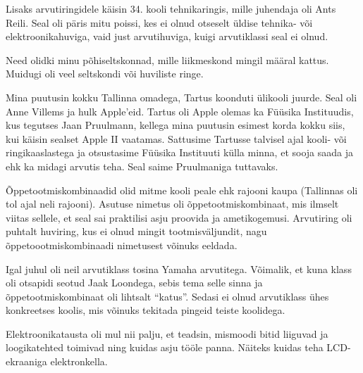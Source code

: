 Lisaks arvutiringidele käisin 34. kooli 
tehnikaringis, mille juhendaja oli Ants Reili. Seal oli 
päris mitu poissi, kes ei olnud otseselt üldise tehnika- 
või elektroonikahuviga, vaid just arvutihuviga, kuigi arvutiklassi
seal ei olnud.

Need olidki minu põhiseltskonnad, mille liikmeskond mingil määral kattus. Muidugi oli 
veel seltskondi või huviliste ringe.


Mina puutusin kokku Tallinna omadega, Tartus koonduti ülikooli 
juurde. Seal oli Anne Villems ja hulk
Apple'eid. Tartus oli Apple olemas ka Füüsika 
Instituudis, kus tegutses Jaan 
Pruulmann, kellega mina puutusin esimest korda kokku siis, 
kui käisin sealset Apple II vaatamas. Sattusime Tartusse talvisel ajal kooli- või 
ringikaaslastega ja otsustasime Füüsika Instituuti külla minna, 
et sooja saada ja ehk ka midagi
arvutis teha. Seal saime Pruulmaniga tuttavaks.

\label{content!OTK}

Õppetootmiskombinaadid olid mitme kooli peale ehk rajooni 
kaupa (Tallinnas oli tol ajal neli rajooni). 
Asutuse nimetus oli õppetootmiskombinaat, mis ilmselt viitas 
sellele, et seal sai praktilisi asju proovida ja 
ametikogemusi. Arvutiring oli puhtalt huviring, kus ei 
olnud mingit tootmisväljundit, nagu õppetoootmiskombinaadi nimetusest võinuks 
eeldada.


Igal juhul oli neil arvutiklass tosina Yamaha arvutitega. Võimalik, et 
kuna klass oli otsapidi seotud Jaak Loondega, sebis tema selle sinna ja õppetootmiskombinaat oli lihtsalt \enquote{katus}. 
Sedasi ei olnud arvutiklass ühes konkreetses koolis, mis võinuks tekitada pingeid teiste koolidega.


Elektroonikatausta oli mul nii palju, et teadsin, mismoodi bitid 
liiguvad ja loogikatehted toimivad ning kuidas asju tööle panna. 
Näiteks kuidas teha LCD-ekraaniga elektronkella. 

